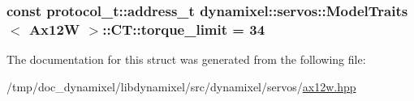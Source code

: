 \subsubsection[{torque\+\_\+limit}]{\setlength{\rightskip}{0pt plus 5cm}const {\bf protocol\+\_\+t\+::address\+\_\+t} {\bf dynamixel\+::servos\+::\+Model\+Traits}$<$ {\bf Ax12\+W} $>$\+::C\+T\+::torque\+\_\+limit = 34\hspace{0.3cm}{\ttfamily [static]}}\label{structdynamixel_1_1servos_1_1_model_traits_3_01_ax12_w_01_4_1_1_c_t_a4424772bd85ab7bb66c4c8f44a418fa5}


The documentation for this struct was generated from the following file\+:\begin{DoxyCompactItemize}
\item 
/tmp/doc\+\_\+dynamixel/libdynamixel/src/dynamixel/servos/\hyperlink{ax12w_8hpp}{ax12w.\+hpp}\end{DoxyCompactItemize}
